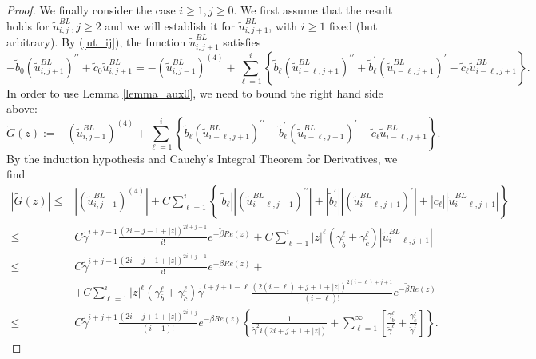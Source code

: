 \documentclass[12pt]{article}
\begin{document}
\begin{proof}
We finally consider the case $i\geq 1,j\geq 0$. We first assume that the result holds for $\tilde{u}^{BL}_{i,j}, j\geq 2$ and we will establish it for $\tilde{u}^{BL}_{i,j+1}$, with $i\geq 1$ fixed (but arbitrary). By (\ref{ut_ij}), the function $\tilde{u}^{BL}_{i,j+1}$ satisfies
%
$$
-\tilde{b}_0\left(\tilde{u}_{i, j+1}^{B L}\right)^{\prime \prime}+\tilde{c}_0 \tilde{u}_{i, j+1}^{B L}=-\left(\tilde{u}_{i, j-1}^{B L}\right)^{(4)}+\sum_{\ell=1}^i\left\{\tilde{b}_{\ell}\left(\tilde{u}_{i-\ell, j+1}^{B L}\right)^{\prime \prime}+\tilde{b}_{\ell}^{\prime}\left(\tilde{u}_{i-\ell, j+1}^{B L}\right)^{\prime}-\tilde{c}_{\ell} \tilde{u}_{i-\ell, j+1}^{B L}\right\} .
$$
%
In order to use Lemma \ref{lemma_aux0}, we need to bound the right hand side above:
%
$$
\tilde{G}(z):=-\left(\tilde{u}_{i, j-1}^{B L}\right)^{(4)}+\sum_{\ell=1}^i\left\{\tilde{b}_{\ell}\left(\tilde{u}_{i-\ell, j+1}^{B L}\right)^{\prime \prime}+\tilde{b}_{\ell}^{\prime}\left(\tilde{u}_{i-\ell, j+1}^{B L}\right)^{\prime}-\tilde{c}_{\ell} \tilde{u}_{i-\ell, j+1}^{B L}\right\} .
$$
%
By the induction hypothesis and Cauchy's Integral Theorem for Derivatives, we find
%
$$
\begin{aligned}
|\tilde{G}(z)| \leq & \left|\left(\tilde{u}_{i, j-1}^{B L}\right)^{(4)}\right|+C \sum_{\ell=1}^i\left\{\left|\tilde{b}_{\ell}\right|\left|\left(\tilde{u}_{i-\ell, j+1}^{B L}\right)^{\prime \prime}\right|+\left|\tilde{b}_{\ell}^{\prime}\right|\left|\left(\tilde{u}_{i-\ell, j+1}^{B L}\right)^{\prime}\right|+\left|\tilde{c}_{\ell}\right|\left|\tilde{u}_{i-\ell, j+1}^{B L}\right|\right\} \\
\leq & C \tilde{\gamma}^{i+j-1} \frac{(2 i+j-1+|z|)^{2 i+j-1}}{i!} e^{-\tilde{\beta} R e(z)}+C \sum_{\ell=1}^i|z|^{\ell}\left(\gamma_{\tilde{b}}^{\ell}+\gamma_{\tilde{c}}^{\ell}\right)\left|\tilde{u}_{i-\ell, j+1}^{B L}\right| \\
\leq & C \tilde{\gamma}^{i+j-1} \frac{(2 i+j-1+|z|)^{2 i+j-1}}{i!} e^{-\tilde{\beta} R e(z)}+ \\
& +C \sum_{\ell=1}^i|z|^{\ell}\left(\gamma_{\bar{b}}^{\ell}+\gamma_{\tilde{c}}^{\ell}\right) \tilde{\gamma}^{i+j+1-\ell} \frac{(2(i-\ell)+j+1+|z|)^{2(i-\ell)+j+1}}{(i-\ell)!} e^{-\tilde{\beta} R e(z)} \\
\leq & C \tilde{\gamma}^{i+j+1} \frac{(2 i+j+1+|z|)^{2 i+j}}{(i-1)!} e^{-\tilde{\beta} R e(z)}\left\{\frac{1}{\tilde{\gamma}^2 i(2 i+j+1+|z|)}+\sum_{\ell=1}^{\infty}\left[\frac{\gamma_{\tilde{b}}^{\ell}}{\tilde{\gamma}^{\ell}}+\frac{\gamma_{\tilde{c}}^{\ell}}{\tilde{\gamma}^{\ell}}\right]\right\} .
\end{aligned}
$$
\end{proof}
\end{document}
